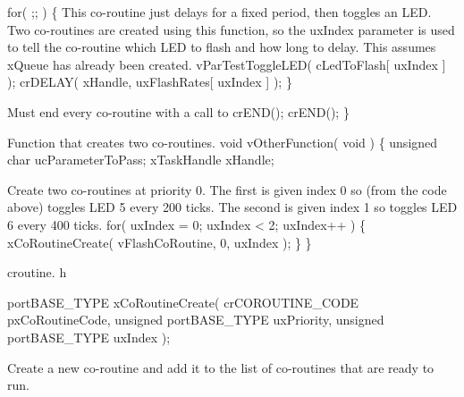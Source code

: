 \begin{DoxyPre}     for( ;; )
     \{
This co-routine just delays for a fixed period, then toggles
an LED.  Two co-routines are created using this function, so
the uxIndex parameter is used to tell the co-routine which
LED to flash and how long to delay.  This assumes xQueue has
already been created.
         vParTestToggleLED( cLedToFlash[ uxIndex ] );
         crDELAY( xHandle, uxFlashRates[ uxIndex ] );
     \}\end{DoxyPre}



\begin{DoxyPre}Must end every co-routine with a call to crEND();
     crEND();
 \}\end{DoxyPre}



\begin{DoxyPre}Function that creates two co-routines.
 void vOtherFunction( void )
 \{
 unsigned char ucParameterToPass;
 xTaskHandle xHandle;\end{DoxyPre}



\begin{DoxyPre}Create two co-routines at priority 0.  The first is given index 0
so (from the code above) toggles LED 5 every 200 ticks.  The second
is given index 1 so toggles LED 6 every 400 ticks.
     for( uxIndex = 0; uxIndex < 2; uxIndex++ )
     \{
         xCoRoutineCreate( vFlashCoRoutine, 0, uxIndex );
     \}
 \}
   \end{DoxyPre}


croutine. h 
\begin{DoxyPre}
 portBASE\_TYPE xCoRoutineCreate(
                                 crCOROUTINE\_CODE pxCoRoutineCode,
                                 unsigned portBASE\_TYPE uxPriority,
                                 unsigned portBASE\_TYPE uxIndex
                               );\end{DoxyPre}


Create a new co-\/routine and add it to the list of co-\/routines that are ready to run.



